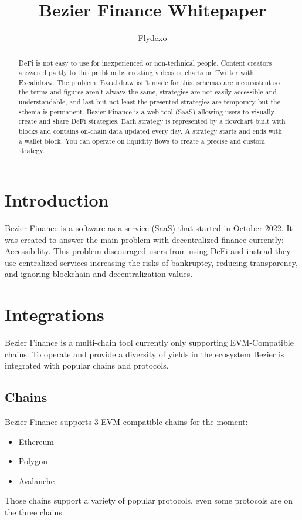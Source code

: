 \documentclass{article}
\title{Bezier Finance Whitepaper}
\author{Flydexo}
\begin{document}
\maketitle
\begin{abstract}
    DeFi is not easy to use for inexperienced or non-technical people. Content creators answered partly to this problem by creating videos or charts on Twitter with Excalidraw. The problem: Excalidraw isn't made for this, schemas are inconsistent so the terms and figures aren't always the same, strategies are not easily accessible and understandable, and last but not least the presented strategies are temporary but the schema is permanent.
    Bezier Finance is a web tool (SaaS) allowing users to visually create and share DeFi strategies. Each strategy is represented by a flowchart built with blocks and contains on-chain data updated every day. A strategy starts and ends with a wallet block. You can operate on liquidity flows to create a precise and custom strategy.
\end{abstract}
\pagebreak
\tableofcontents
\pagebreak
\section{Introduction}
Bezier Finance is a software as a service (SaaS) that started in October 2022. It was created to answer the main problem with decentralized finance currently: Accessibility. This problem discouraged users from using DeFi and instead they use centralized services increasing the risks of bankruptcy, reducing transparency, and ignoring blockchain and decentralization values.
\section{Integrations}
Bezier Finance is a multi-chain tool currently only supporting EVM-Compatible chains. To operate and provide a diversity of yields in the ecosystem Bezier is integrated with popular chains and protocols.
\subsection{Chains}
Bezier Finance supports 3 EVM compatible chains for the moment:
\begin{itemize}
    \item Ethereum
    \item Polygon
    \item Avalanche
\end{itemize}
Those chains support a variety of popular protocols, even some protocols are on the three chains.
\end{document}

